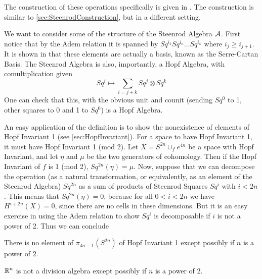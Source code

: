 The construction of these operations specifically is given in \cite[Ch~2]{MosherTengora}.  
The construction is similar to \ref{sec:SteenrodConstruction}, but in a different setting.  

We want to consider some of the structure of the Steenrod Algebra $\mathcal{A}$.  
First notice that by the Adem relation it is spanned by $Sq^{i_1}Sq^{i_n}...Sq^{i_k}$ where $i_j\ge i_{j+1}$.  
It is shown in \cite[Ch~6]{MosherTengora} that these elements are actually a basis, known as the Serre-Cartan Basis.  
The Steenrod Algebra is also, importantly, a Hopf Algebra, with comultiplication given
\[Sq^i\mapsto \sum_{i=j+k} Sq^j\otimes Sq^k\]
One can check that this, with the obvious unit and counit (sending $Sq^0$ to 1, other squares to 0 and 1 to $Sq^0$) is a Hopf Algebra.  

An easy application of the definition is to show the nonexistence of elements of Hopf Invariant 1 (see \ref{sec:HopfInvariant}).
For a space to have Hopf Invariant 1, it must have Hopf Invariant 1 (mod 2).  
Let $X=S^{2n}\cup_f e^{4n}$ be a space with Hopf Invariant, and let $\eta$ and $\mu$ be the two generators of cohomology.  
Then if the Hopf Invariant of $f$ is 1 (mod 2), $Sq^{2n}(\eta)=\mu$.
Now, suppose that we can decompose the operation (as a natural transformation, or equivalently, as an element of the Steenrod Algebra) $Sq^{2n}$ as a sum of products of Steenrod Squares $Sq^i$ with $i<2n$.  
This means that $Sq^{2n}(\eta)=0$, because for all $0<i<2n$ we have $H^{i+2n}(X)=0$, since there are no cells in these dimensions.  
But it is an easy exercise in using the Adem relation to show $Sq^i$ is decomposable if $i$ is not a power of 2.  
Thus we can conclude
\begin{Cor}
  There is no element of $\pi_{4n-1}(S^{2n})$ of Hopf Invariant 1 except possibly if $n$ is a power of $2$.  
\end{Cor}
\begin{Cor}
  $\mathbb{R}^n$ is not a division algebra except possibly if $n$ is a power of $2$.  
\end{Cor}


